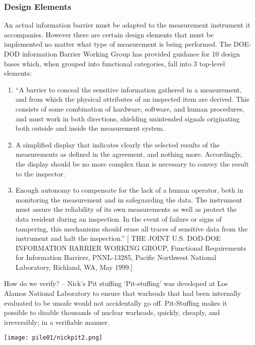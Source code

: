 \documentclass[twoside,titlepage,11pt,twocolumn,a4paper]{article}
\begin{document}
\subsubsection{Design Elements}
An actual information barrier must be adapted to the measurement
instrument it accompanies. However there are certain design elements
that must be implemented no matter what type of measurement is being
performed. The DOE-DOD information Barrier Working Group has provided
guidance for 10 design bases which, when grouped into functional
categories, fall into 3 top-level elements: 
\begin{enumerate}
  \item ``A barrier to conceal the sensitive information gathered in a
    measurement, and from which the physical attributes of an
    inspected item are derived. This consists of some combination of
    hardware, software, and human procedures, and must work in both
    directions, shielding unintended signals originating both outside
    and inside the measurement system.
  \item A simplified display that indicates clearly the selected
    results of the measurements as defined in the agreement, and
    nothing more. Accordingly, the display should be no more complex
    than is necessary to convey the result to the inspector.
  \item Enough autonomy to compensate for the lack of a human
    operator, both in monitoring the measurement and in safeguarding
    the data. The instrument must assure the reliability of its own
    measurements as well as protect the data resident during an
    inspection. In the event of failure or signs of tampering, this
    mechanisms should erase all traces of sensitive data from the
    instrument and halt the inspection.''  [ THE JOINT U.S. DOD-DOE
      INFORMATION BARRIER WORKING GROUP, Functional Requirements for
      Information Barriers, PNNL-13285, Pacific Northwest National
      Laboratory, Richland, WA, May 1999.]
\end{enumerate}

How do we verify? -- Nick’s Pit stuffing `Pit-stuffing' was developed
at Los Alamos National Laboratory to ensure that warheads that had
been internally evaluated to be unsafe would not accidentally go
off. Pit-Stuffing makes it possible to disable thousands of nuclear
warheads, quickly, cheaply, and irreversibly; in a verifiable manner.

\begin{figure*}
  \texttt{[image: pile01/nickpit2.png]}
\end{figure*}
\end{document}
